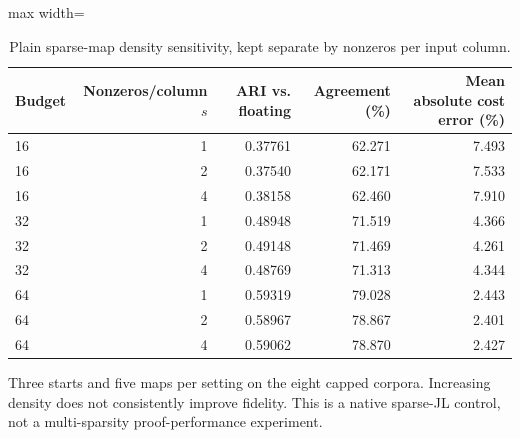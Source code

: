 \begin{table}[tp]
\caption{Plain sparse-map density sensitivity, kept separate by nonzeros per input column.}\label{tab:sparsity}
\centering\small
\begin{adjustbox}{max width=\textwidth}
\begin{tabular}{@{}lrrrr@{}}
\toprule
Budget & Nonzeros/column $s$ & ARI vs. floating & Agreement (\%) & Mean absolute cost error (\%) \\
\midrule
16 & 1 & 0.37761 & 62.271 & 7.493 \\
16 & 2 & 0.37540 & 62.171 & 7.533 \\
16 & 4 & 0.38158 & 62.460 & 7.910 \\
32 & 1 & 0.48948 & 71.519 & 4.366 \\
32 & 2 & 0.49148 & 71.469 & 4.261 \\
32 & 4 & 0.48769 & 71.313 & 4.344 \\
64 & 1 & 0.59319 & 79.028 & 2.443 \\
64 & 2 & 0.58967 & 78.867 & 2.401 \\
64 & 4 & 0.59062 & 78.870 & 2.427 \\
\bottomrule
\end{tabular}
\end{adjustbox}
\par\vspace{3pt}\begin{minipage}{0.98\textwidth}\footnotesize Three starts and five maps per setting on the eight capped corpora. Increasing density does not consistently improve fidelity. This is a native sparse-JL control, not a multi-sparsity proof-performance experiment.\end{minipage}
\end{table}
